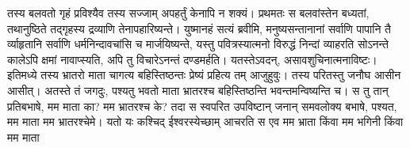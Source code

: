 \vakya तस्य बलवतो गृहं प्रविश्यैव तस्य सज्जाम् अपहर्तुं केनापि न शक्यं। प्रथमतः स बलवांस्तेन बध्यतां, तथानुष्ठिते तद्गृहस्य द्रव्याणि तेनापहारिष्यन्ते।
\vakya युष्मानहं सत्यं ब्रवीमि, मनुष्यसन्तानानां सर्वाणि पापानि तै र्व्याहृतानि सर्वाणि धर्मनिन्दावचांसि च मार्जयिष्यन्ते,
\vakya यस्तु पवित्रस्यात्मनो विरुद्धं निन्दां व्याहरति सोऽनन्ते कालेऽपि क्षमां नावाप्स्यति, अपि तु विचारेऽनन्तं दण्डमर्हति।
\vakya यतस्तेऽवदन्, असावशुचिनात्मनाविष्टः।
\vakya इतिमध्ये तस्य भ्रातरो माता चागत्य बहिस्तिष्ठन्तः प्रेष्यं प्रहित्य तम् आजुहुवुः।
\vakya तस्य परितस्तु जनौघ आसीन आसीत्। अतस्ते तं जगदुः, पश्यतु भवतो माता भ्रातरश्च बहिस्तिष्ठन्ति भवन्तमन्विष्यन्ति च।
\vakya स तु तान् प्रतिबभाषे, मम माता का? मम भ्रातरश्च के?
\vakya तदा स स्वपरित उपविष्टान् जनान् समवलोक्य बभाषे, पश्यत, मम माता मम भ्रातरश्चेमे।
\vakya यतो यः कश्चिद् ईश्वरस्येच्छाम् आचरति स एव मम भ्राता किंवा मम भगिनी किंवा मम माता\eoc